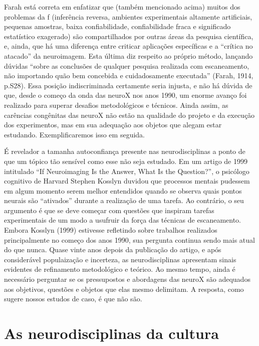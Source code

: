 Farah está correta em enfatizar que (também mencionado acima) muitos dos
problemas da f (inferência reversa, ambientes experimentais altamente
artificiais, pequenas amostras, baixa confiabilidade, confiabilidade
fraca e significado estatístico exagerado) são compartilhados por outras
áreas da pesquisa científica, e, ainda, que há uma diferença entre
criticar aplicações específicas e a ``crítica no atacado'' da
neuroimagem. Esta última diz respeito ao próprio método, lançando
dúvidas ``sobre as conclusões de qualquer pesquisa realizada com
escaneamento, não importando quão bem concebida e cuidadosamente
executada'' (Farah, 1914, p.S28). Essa posição indiscriminada certamente
seria injusta, e não há dúvida de que, desde o começo da onda das neuroX
nos anos 1990, um enorme avanço foi realizado para superar desafios
metodológicos e técnicos. Ainda assim, as carências congênitas das
neuroX não estão na qualidade do projeto e da execução dos experimentos,
mas em sua adequação aos objetos que alegam estar estudando.
Exemplificaremos isso em seguida.

É revelador a tamanha autoconfiança presente nas neurodisciplinas a
ponto de que um tópico tão sensível como esse não seja estudado. Em um
artigo de 1999 intitulado ``If Neuroimaging Is the Answer, What Is the
Question?'', o psicólogo cognitivo de Harvard Stephen Kosslyn duvidou
que processos mentais pudessem em algum momento serem melhor entendidos
quando se observa quais pontos neurais são ``ativados'' durante a
realização de uma tarefa. Ao contrário, o seu argumento é que se deve
começar com questões que inspiram tarefas experimentais de um modo a
usufruir da força das técnicas de escaneamento. Embora Kosslyn (1999)
estivesse refletindo sobre trabalhos realizados principalmente no começo
dos anos 1990, sua pergunta continua sendo mais atual do que nunca.
Quase vinte anos depois da publicação do artigo, e após considerável
populaização e incerteza, as neurodisciplinas apresentam sinais
evidentes de refinamento metodológico e teórico. Ao mesmo tempo, ainda é
necessário perguntar se os pressupostos e abordagens das neuroX são
adequados aos objetivos, questões e objetos que elas mesmo delimitam. A
resposta, como sugere nossos estudos de caso, é que não são.

\chapter{As neurodisciplinas da cultura}

